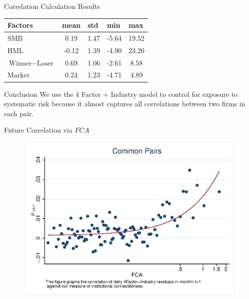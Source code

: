\documentclass{beamer}
\begin{document}
	\begin{frame}{Correlation Calculation Results}
		
		
		\begin{table}[htbp]
			\centering 
			\scriptsize
			{
				\begin{tabular}{lcccc}\hline\hline
					Factors  & \multicolumn{1}{l}{mean} & \multicolumn{1}{l}{std} & \multicolumn{1}{l}{min} & \multicolumn{1}{l}{max} \\
					\hline
					SMB     & 0.19  & 1.47  & -5.64 & 19.52 \\
					HML   & -0.12 & 1.39  & -4.90 & 23.20 \\
					$ \text{Winner}-\text{Loser} $   & 0.69  & 1.06  & -2.61 & 8.58 \\
					$ \text{Market} $  & 0.24  & 1.23  & -4.71 & 4.89 \\\hline\hline
			\end{tabular}                          }
		\end{table}
		
		
		
		\begin{table}[htbp]
			\centering 
			\scriptsize
			\resizebox{\textwidth}{!}{
				              
			}
		\end{table}
		
		
		\begin{block}{Conclusion}
			\scriptsize
			We use the 4 Factor + Industry model to control for exposure to systematic risk because it almost captures all correlations between two firms in each pair.
		\end{block}
	\end{frame}
	
	
	\begin{frame}{Future Correlation via $ FCA $}
		\begin{figure}
			\centering  
			\includegraphics[width=0.85\linewidth]{"mcorr50.eps"}
		\end{figure}
	\end{frame}   
	
\end{document}
